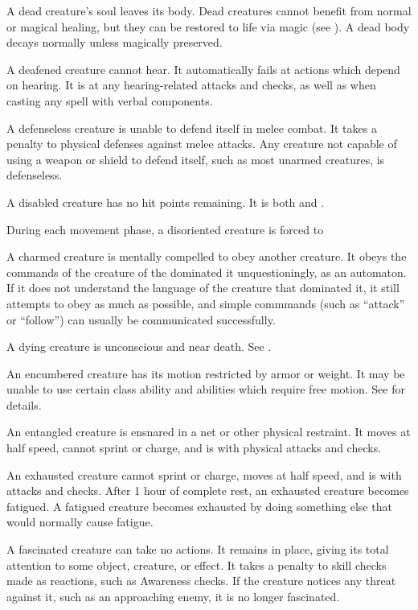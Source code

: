  A dead creature's soul leaves its body. Dead creatures cannot benefit from normal or magical healing, but they can be restored to life via magic (see ). A dead body decays normally unless magically preserved.

 A deafened creature cannot hear. It automatically fails at actions which depend on hearing. It is \impaired at any hearing-related attacks and checks, as well as when casting any spell with verbal components.

 A defenseless creature is unable to defend itself in melee combat. It takes a  penalty to physical defenses against melee attacks. Any creature not capable of using a weapon or shield to defend itself, such as most unarmed creatures, is defenseless.

 A disabled creature has no hit points remaining.
It is both \staggered and \bloodied.

 During each movement phase, a disoriented creature is forced to

 A charmed creature is mentally compelled to obey another creature.
It obeys the commands of the creature of the dominated it unquestioningly, as an automaton.
If it does not understand the language of the creature that dominated it, it still attempts to obey as much as possible, and simple commmands (such as ``attack'' or ``follow'') can usually be communicated successfully.

 A dying creature is unconscious and near death. See .

 An encumbered creature has its motion restricted by armor or weight. It may be unable to use certain class ability and abilities which require free motion. See  for details.

 An entangled creature is ensnared in a net or other physical restraint.
It moves at half speed, cannot sprint or charge, and is \impaired with physical attacks and checks.

 An exhausted creature cannot sprint or charge, moves at half speed, and is \impaired with attacks and checks. After 1 hour of complete rest, an exhausted creature becomes fatigued. A fatigued creature becomes exhausted by doing something else that would normally cause fatigue.

 A fascinated creature can take no actions. It remains in place, giving its total attention to some object, creature, or effect. It takes a  penalty to skill checks made as reactions, such as Awareness checks. If the creature notices any threat against it, such as an approaching enemy, it is no longer fascinated.


